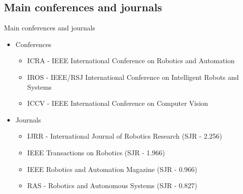 \subsection{Main conferences and journals}
\begin{frame}{Main conferences and journals}
	\begin{itemize}
		\item Conferences
		\begin{itemize}
			\item ICRA - IEEE International Conference on Robotics and Automation
			\item IROS - IEEE/RSJ International Conference on Intelligent Robots and Systems
			\item ICCV - IEEE International Conference on Computer Vision
		\end{itemize}
		\item Journals
		\begin{itemize}
			\item IJRR - International Journal of Robotics Research (SJR - 2.256)
			\item IEEE Transactions on Robotics (SJR - 1.966)
			\item IEEE Robotics and Automation Magazine (SJR - 0.966)
			\item RAS - Robotics and Autonomous Systems (SJR - 0.827)
		\end{itemize}
	\end{itemize}

\end{frame}

